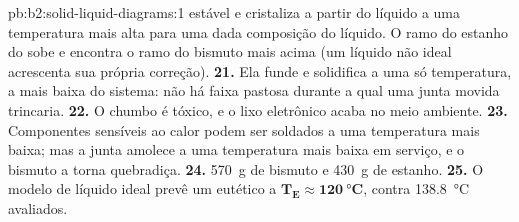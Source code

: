\begin{solution}{pb:b2:solid-liquid-diagrams:1}
estável e cristaliza a partir do líquido a uma temperatura mais alta para uma
dada composição do líquido. O ramo do estanho do  sobe e encontra o
ramo do bismuto mais acima (um líquido não ideal acrescenta sua própria
correção).
\textbf{21.} Ela funde e solidifica a uma só temperatura, a mais baixa do
sistema: não há faixa pastosa durante a qual uma junta movida trincaria.
\textbf{22.} O chumbo é tóxico, e o lixo eletrônico acaba no meio ambiente.
\textbf{23.} Componentes sensíveis ao calor podem ser soldados a uma
temperatura mais baixa; mas a junta amolece a uma temperatura mais baixa em
serviço, e o bismuto a torna quebradiça.
\textbf{24.} \qty{570}{g} de bismuto e \qty{430}{g} de estanho.
\textbf{25.} O modelo de líquido ideal prevê um eutético a $\boldsymbol{T_E
\approx \qty{120}{\degreeCelsius}}$, contra \qty{138.8}{\degreeCelsius}
avaliados.
\end{solution}
